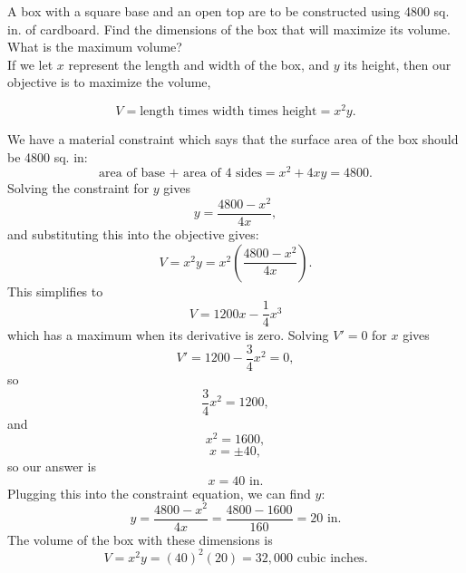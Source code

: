 \documentclass{ximera}
\begin{document}
\begin{example}[example 2]
A box with a square base and an open top are to be constructed using 4800 sq. in. of cardboard.  Find the dimensions of the box that will maximize its volume.  What is the maximum volume?\\

If we let $x$ represent the length and width of the box, and $y$ its height, then our objective is to maximize 
the volume,


\begin{center}
\end{center}

\[V = \text{length times width times height} = x^2y.\]

We have a material constraint which says that the surface area of the box should be 4800 sq. in:
\[\text{area of base + area of 4 sides} = x^2 + 4xy = 4800.\]
Solving the constraint for $y$ gives
\[y = \frac{4800 - x^2}{4x},\]
and substituting this into the objective gives:
\[V = x^2y = x^2 \left(\frac{4800 - x^2}{4x}\right).\]
This simplifies to 
\[V = 1200x - \frac14 x^3\]
which has a maximum when its derivative is zero.
Solving $V' = 0$ for $x$ gives
\[V' = 1200 - \frac34 x^2 = 0,\]
so
\[ \frac34 x^2 = 1200, \]
and 
\[x^2 = 1600,\]
\[x = \pm 40,\]
so our answer is 
\[x = 40 \mbox{ in.}\]
Plugging this into the constraint equation, we can find $y$:
\[y = \frac{4800 - x^2}{4x} = \frac{4800 - 1600}{160} = 20 \mbox{ in.}\]
The volume of the box with these dimensions is
\[V = x^2y = (40)^2 (20) = 32{,}000 \mbox{ cubic inches}.\]

\end{example}


\begin{center}
\begin{foldable}
\end{foldable}
\end{center}
\end{document}
